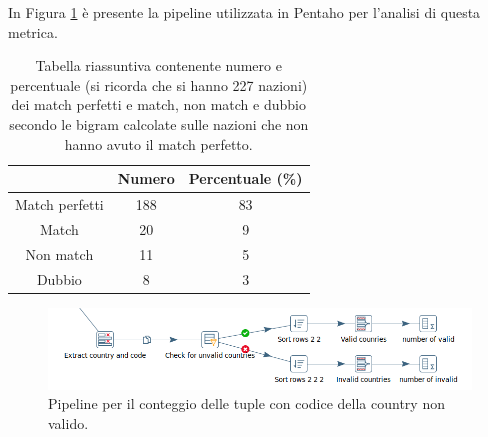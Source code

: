 In Figura \ref{fig:dqcountrycodeaccuracy} è presente la pipeline utilizzata in Pentaho per l'analisi di questa metrica.
\begin{table}
	\caption{Tabella riassuntiva contenente numero e percentuale (si ricorda che si hanno 227 nazioni) dei match perfetti e match, non match e dubbio secondo le bigram calcolate sulle nazioni che non hanno avuto il match perfetto.}
	
	\label{tab:matches}
	
	\centering
	\begin{tabular}{|c|c|c|}
		\hline
		 & \textbf{Numero} & \textbf{Percentuale (\%)} \\ 
		\hline  
		\rule{0pt}{13pt}Match perfetti & 188 & 83 \\ 
		\hline  
		\rule{0pt}{13pt}Match & 20 & 9 \\ 
		\hline  
		\rule{0pt}{13pt}Non match & 11 & 5 \\ 
		\hline  
		\rule{0pt}{13pt}Dubbio & 8 & 3 \\ 
		\hline   
	\end{tabular}
\end{table} 

\begin{figure}[h!]
	\centering
	\includegraphics[width=0.7\linewidth]{images/DQ_countrycodeaccuracy}
	\caption{Pipeline per il conteggio delle tuple con codice della country non valido.}
	\label{fig:dqcountrycodeaccuracy}
\end{figure}


